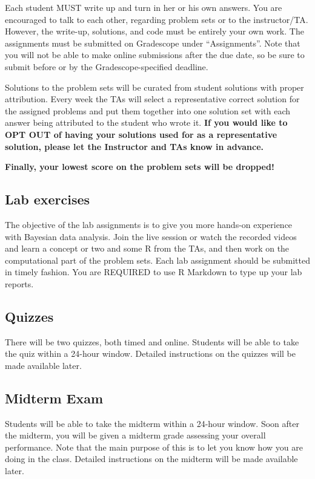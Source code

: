 \documentclass[11pt, a4paper]{article}
\begin{document}
Each student MUST write up and turn in her or his own answers. You are encouraged to talk to each other, regarding problem sets or to the instructor/TA. However, the write-up, solutions, and code must be entirely your own work. The assignments must be submitted on Gradescope under ``Assignments''. Note that you will not be able to make online submissions after the due date, so be sure to submit before or by the Gradescope-specified deadline.

Solutions to the problem sets will be curated from student solutions with proper attribution. Every week the TAs will select a representative correct solution for the assigned problems and put them together into one solution set with each answer being attributed to the student who wrote it. \textbf{If you would like to OPT OUT of having your solutions used for as a representative solution, please let the Instructor and TAs know in advance.}

\textbf{Finally, your lowest score on the problem sets will be dropped!}

\subsection{Lab exercises}
The objective of the lab assignments is to give you more hands-on experience with Bayesian data analysis. Join the live session or watch the recorded videos and learn a concept or two and some R from the TAs, and then work on the computational part of the problem sets. Each lab assignment should be submitted in timely fashion. You are REQUIRED to use R Markdown to type up your lab reports.

\subsection{Quizzes}
There will be two quizzes, both timed and online. Students will be able to take the quiz within a 24-hour window. Detailed instructions on the quizzes will be made available later.

\subsection{Midterm Exam}
Students will be able to take the midterm within a 24-hour window.  Soon after the midterm, you will be given a midterm grade assessing your overall performance. Note that the main purpose of this is to let you know how you are doing in the class. Detailed instructions on the midterm will be made available later.
\end{document}

